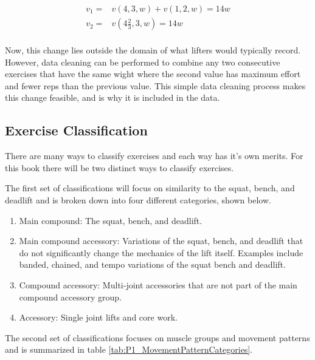 \begin{equation*}
    \begin{split}
        v_1=&v(4,3,w)+v(1,2,w)=14w \\
        v_2=&v\left(4\frac{2}{3},3,w\right)=14w \\
    \end{split}
\end{equation*}

Now, this change lies outside the domain of what lifters would typically record. However, data cleaning can be performed to combine any two consecutive exercises that have the same wight where the second value has maximum effort and fewer reps than the previous value. This simple data cleaning process makes this change feasible, and is why it is included in the data.

\subsection{Exercise Classification}
\label{sec:P1_ExerciseClassification}

There are many ways to classify exercises and each way has it's own merits. For this book there will be two distinct ways to classify exercises.

The first set of classifications will focus on similarity to the squat, bench, and deadlift and is broken down into four different categories, shown below.

\begin{enumerate}
	\item Main compound: The squat, bench, and deadlift.
	\item Main compound accessory: Variations of the squat, bench, and deadlift that do not significantly change the mechanics of the lift itself. Examples include banded, chained, and tempo variations of the squat bench and deadlift.
	\item Compound accessory: Multi-joint accessories that are not part of the main compound accessory group.
	\item Accessory: Single joint lifts and core work.
\end{enumerate}

The second set of classifications focuses on muscle groups and movement patterns and is summarized in table \ref{tab:P1_MovementPatternCategories}.

